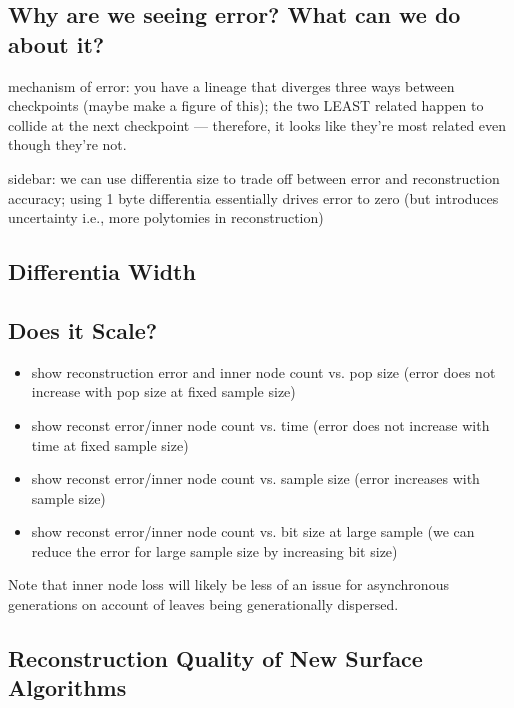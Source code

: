 \subsection{Why are we seeing error? What can we do about it?} \label{sec:error-uncertainty}

mechanism of error: you have a lineage that diverges three ways between checkpoints (maybe make a figure of this); the two LEAST related happen to collide at the next checkpoint --- therefore, it looks like they're most related even though they're not.

sidebar: we can use differentia size to trade off between error and reconstruction accuracy; using 1 byte differentia essentially drives error to zero (but introduces uncertainty i.e., more polytomies in reconstruction)

\subsection{Differentia Width} \label{sec:bit-vs-byte}



\subsection{Does it Scale?} \label{sec:scaling}



\begin{itemize}
    \item show reconstruction error and inner node count vs. pop size (error does not increase with pop size at fixed sample size)
    \item show reconst error/inner node count vs. time (error does not increase with time at fixed sample size)
    \item show reconst error/inner node count vs. sample size (error increases with sample size)
    \item show reconst error/inner node count vs. bit size at large sample (we can reduce the error for large sample size by increasing bit size)
\end{itemize}

Note that inner node loss will likely be less of an issue for asynchronous generations on account of leaves being generationally dispersed.

\subsection{Reconstruction Quality of New Surface Algorithms}

